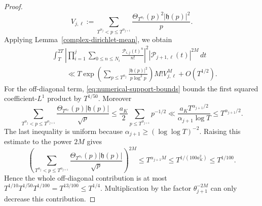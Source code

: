 \documentclass[twoside,reqno,11pt,a4paper]{amsart}
\numberwithin{equation}{section}
\theoremstyle{plain}
\theoremstyle{definition}
\theoremstyle{remark}
\renewcommand{\le}{\leqslant}
\renewcommand{\ge}{\geqslant}
\begin{document}
\begin{proof}
\begin{equation*}
        V_{j,\ell}:=
        \sum_{T^{\alpha_j}<p\le  T^{\alpha_{j+1}}}
        \frac{\Theta_{T^{\alpha_\ell}}(p)^2|\mathfrak h(p)|^2}{p}.
\end{equation*}
Applying Lemma~\ref{complex-dirichlet-mean}, we obtain
\begin{align}\label{eq:second-lemma-mean-bound}
        &\int_T^{2T}
        \left|
        \prod_{i=1}^{j}\sum_{0\le  n\le  N_i}\frac{\mathcal P_{i,j}(t)^n}{n!}
        \right|^2
        |\mathcal P_{j+1,\ell}(t)|^{2M}\,dt                         \\
        &\qquad\ll
        T\exp\left(
        \sum_{p\le  T^{\alpha_j}}\frac{|\mathfrak h(p)|^2}{p\log^2p}
        \right)M!V_{j,\ell}^M
        +O(T^{1/2}).
\end{align}
For the off-diagonal term, \eqref{eq:numerical-support-bounds} bounds the
first squared coefficient-$L^1$ product by $T^{1/50}$.  Moreover
\begin{equation*}
        \sum_{T^{\alpha_j}<p\le  T^{\alpha_{j+1}}}
        \frac{\Theta_{T^{\alpha_\ell}}(p)|\mathfrak h(p)|}{\sqrt p}
        \le
        \frac{a_K}{2}\sum_{p\le  T^{\alpha_{j+1}}}p^{-1/2}
        \ll
        \frac{a_KT^{\alpha_{j+1}/2}}
        {\alpha_{j+1}\log T}
        \le T^{\alpha_{j+1}/2}.
\end{equation*}
The last inequality is uniform because
$\alpha_{j+1}\ge(\log\log T)^{-2}$.  Raising this estimate to the power
$2M$ gives
\begin{equation}\label{eq:exceptional-l1-bound}
        \left(
        \sum_{T^{\alpha_j}<p\le T^{\alpha_{j+1}}}
        \frac{\Theta_{T^{\alpha_\ell}}(p)|\mathfrak h(p)|}{\sqrt p}
        \right)^{2M}
        \le T^{\alpha_{j+1}M}
        \le T^{1/(100a_K^2)}
        \le T^{1/100}.
\end{equation}
Hence the whole off-diagonal contribution is at most
$    T^{1/10}T^{1/50}T^{1/100}=T^{13/100}\le T^{1/4}$.
Multiplication by the factor $\theta_{j+1}^{-2M}$ can only decrease this contribution.


\end{proof}
\end{document}
